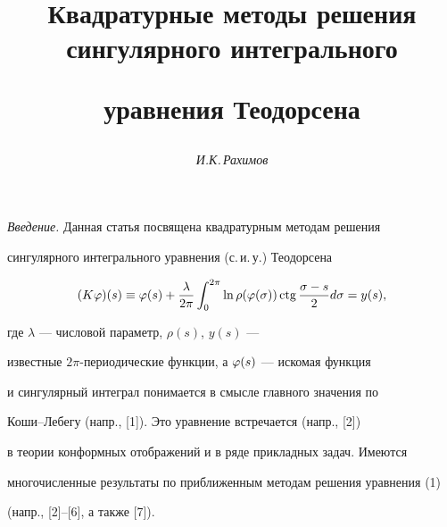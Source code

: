 \author{\it И.К.\,Рахимов}




\title{Квадратурные методы решения сингулярного интегрального 


уравнения Теодорсена}





\date{}




\pagestyle{plain} %







\maketitle


\label{begin}











{\it Введение.} Данная статья посвящена квадратурным методам решения 


сингулярного интегрального уравнения (с.\,и.\,у.) Теодорсена 


\begin{equation}


(K\vp)(s)\equiv \vp(s) + \frac{\lambda}{2\pi}\int_{0}^{2\pi}\ln


\rho(\vp(\sigma))\ctg\frac{\sigma-s}{2}d\sigma = y(s),


\end{equation}


где $\lambda$ --- числовой параметр, $\rho(s)$, $y(s)$ ---


известные $2\pi$-периодические функции, а $\varphi(s)$ --- искомая функция


и сингулярный интеграл понимается в смысле главного значения по 


Коши--Лебегу (напр., [1]). Это уравнение встречается (напр., [2])


в теории конформных отображений и в ряде прикладных задач. Имеются 


многочисленные результаты по приближенным методам решения уравнения (1)


(напр., [2]--[6], а также [7]). 


